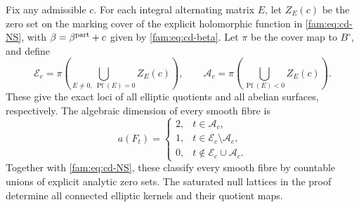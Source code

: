 \begin{theorem}\hypertarget{tag-01QW}{}\label{fam:src:D.1.6}\label{fam:st:D.1.6}

Fix any admissible $c$. For each integral alternating matrix $E$, let
$Z_E(c)$ be the zero set on the marking cover of the explicit holomorphic
function in \eqref{fam:eq:cd-NS}, with $\beta=\beta^{\rm part}+c$ given by
\eqref{fam:eq:cd-beta}. Let $\pi$ be the cover map to $B^\circ$, and define
\[
 \mathcal E_c=\pi\!\left(\bigcup_{E\ne0,\ \operatorname{Pf}(E)=0}Z_E(c)\right),
 \qquad
 \mathcal A_c=\pi\!\left(\bigcup_{\operatorname{Pf}(E)<0}Z_E(c)\right).
\]
These give the exact loci of all elliptic quotients and all abelian
surfaces, respectively. The algebraic dimension of every smooth fibre is
\[
 a(F_t)=
 \begin{cases}
 2,&t\in\mathcal A_c,\\
 1,&t\in\mathcal E_c\setminus\mathcal A_c,\\
 0,&t\notin\mathcal E_c\cup\mathcal A_c.
 \end{cases}
\]
Together with \eqref{fam:eq:cd-NS}, these classify every smooth fibre
by countable unions of explicit analytic zero sets. The saturated null
lattices in the proof determine all connected elliptic kernels and their
quotient maps.
\end{theorem}

